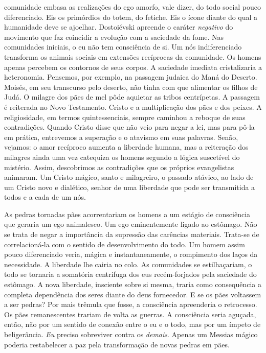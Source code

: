 comunidade embasa as realizações do ego amorfo, vale dizer, do todo
social pouco diferenciado. Eis os primórdios do totem, do fetiche. Eis o
ícone diante do qual a humanidade deve se ajoelhar. Dostoiévski apreende
o caráter \emph{negativo} do movimento que faz coincidir a evolução com
a saciedade da fome. Nas comunidades iniciais, o eu não tem consciência
de si. Um nós indiferenciado transforma os animais sociais em extensões
recíprocas da comunidade. Os homens apenas percebem os contornos de seus
corpos. A saciedade imediata cristalizaria a heteronomia. Pensemos, por
exemplo, na passagem judaica do Maná do Deserto. Moisés, em seu
transcurso pelo deserto, não tinha com que alimentar os filhos de Judá.
O milagre dos pães de mel pôde aquietar as tribos centrípetas. A
passagem é reiterada no Novo Testamento. Cristo e a multiplicação dos
pães e dos peixes. A religiosidade, em termos quintessenciais, sempre
caminhou a reboque de suas contradições. Quando Cristo disse que não
veio para negar a lei, mas para pô-la em prática, entrevemos a superação
e o atavismo em suas palavras. Senão, vejamos: o amor recíproco aumenta
a liberdade humana, mas a reiteração dos milagres ainda uma vez
catequiza os homens segundo a lógica suscetível do mistério. Assim,
descobrimos as contradições que os próprios evangelistas animaram. Um
Cristo mágico, santo e milagreiro, o passado atávico, ao lado de um
Cristo novo e dialético, senhor de uma liberdade que pode ser
transmitida a todos e a cada de um nós.

As pedras tornadas pães acorrentariam os homens a um estágio de
consciência que geraria um ego animalesco. Um ego eminentemente ligado
ao estômago. Não se trata de negar a importância da supressão das
carências materiais. Trata-se de correlacioná-la com o sentido de
desenvolvimento do todo. Um homem assim pouco diferenciado veria, mágica
e instantaneamente, o rompimento dos laços da necessidade. A liberdade
lhe cairia no colo. As comunidades se estilhaçariam, o todo se tornaria
a somatória centrífuga dos eus recém-forjados pela saciedade do
estômago. A nova liberdade, insciente sobre si mesma, traria como
consequência a completa dependência dos seres diante do deus fornecedor.
E se os pães voltassem a ser pedras? Por mais trêmula que fosse, a
consciência apreenderia o retrocesso. Os pães remanescentes trariam de
volta as guerras. A consciência seria aguçada, então, não por um sentido
de conexão entre o eu e o todo, mas por um ímpeto de beligerância.
\emph{Eu} preciso sobreviver contra os \emph{demais}. Apenas um Messias
mágico poderia restabelecer a paz pela transformação de novas pedras em
pães.

